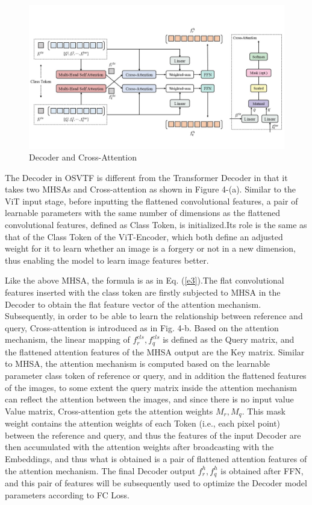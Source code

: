 \documentclass{article}
\begin{document}
\begin{figure}[htbp]
	\centering
	\includegraphics[scale=0.45]{figure/p4.jpg}
	\caption{Decoder and Cross-Attention}\label{fig:p4}
\end{figure}

The Decoder in OSVTF is different from the Transformer Decoder in that it takes two MHSAs and Cross-attention as shown in Figure 4-(a). Similar to the ViT input stage, before inputting the flattened convolutional features, a pair of learnable parameters with the same number of dimensions as the flattened convolutional features, defined as Class Token, is initialized.Its role is the same as that of the Class Token of the ViT-Encoder, which both define an adjusted weight for it to learn whether an image is a forgery or not in a new dimension, thus enabling the model to learn image features better.

Like the above MHSA, the formula is as in Eq. (\ref{e3}).The flat convolutional features inserted with the class token are firstly subjected to MHSA in the Decoder to obtain the flat feature vector of the attention mechanism. Subsequently, in order to be able to learn the relationship between reference and query, Cross-attention is introduced as in Fig. 4-b. Based on the attention mechanism, the linear mapping of $f_r^{cls},f_q^{cls}$ is defined as the Query matrix, and the flattened attention features of the MHSA output are the Key matrix. Similar to MHSA, the attention mechanism is computed based on the learnable parameter class token of reference or query, and in addition the flattened features of the images, to some extent the query matrix inside the attention mechanism can reflect the attention between the images, and since there is no input value Value matrix, Cross-attention gets the attention weights $M_r ,M_q$. This mask weight contains the attention weights of each Token (i.e., each pixel point) between the reference and query, and thus the features of the input Decoder are then accumulated with the attention weights after broadcasting with the Embeddings, and thus what is obtained is a pair of flattened attention features of the attention mechanism. The final Decoder output $f_r^h,f_q^h$ is obtained after FFN, and this pair of features will be subsequently used to optimize the Decoder model parameters according to FC Loss.
\end{document}

